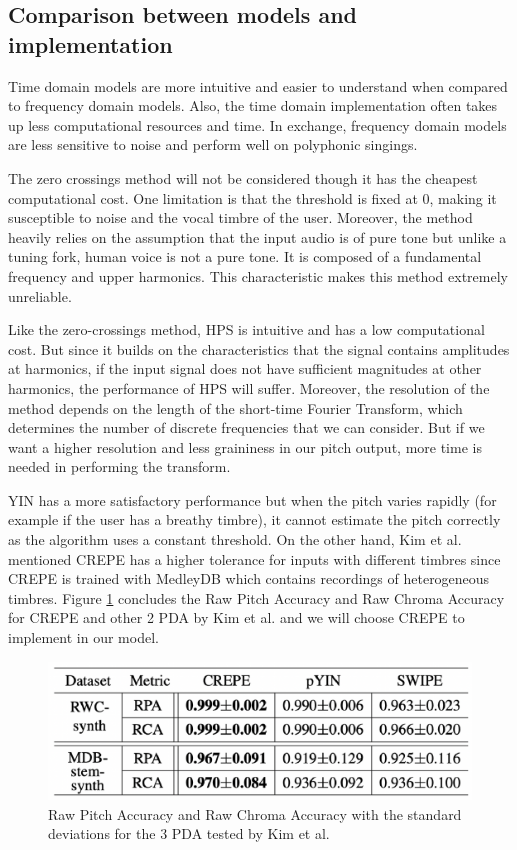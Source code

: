 \subsection{Comparison between models and implementation}
Time domain models are more intuitive and easier to understand when compared to frequency domain models.
Also, the time domain implementation often takes up less computational resources and time.
In exchange, frequency domain models are less sensitive to noise and perform well on polyphonic singings.

The zero crossings method will not be considered though it has the cheapest computational cost. One limitation is that
the threshold is fixed at 0, making it susceptible to noise and the vocal timbre of the user. Moreover, the method heavily relies on
the assumption that the input audio is of pure tone but unlike a tuning fork, human voice is not a pure tone. It is 
composed of a fundamental frequency and upper harmonics.  This characteristic makes this method extremely
unreliable.

Like the zero-crossings method, HPS is intuitive and has a low computational cost. But since it builds on the characteristics 
that the signal contains amplitudes at harmonics, if the input signal does not have sufficient magnitudes at other harmonics, the 
performance of HPS will suffer. Moreover, the resolution of the method depends on the length of the short-time Fourier Transform, which
determines the number of discrete frequencies that we can consider. But if we want a higher resolution and less graininess in our 
pitch output, more time is needed in performing the transform.

YIN has a more satisfactory performance but when the pitch varies rapidly (for example if the user has a breathy timbre), it cannot 
estimate the pitch correctly as the algorithm uses a constant threshold. On the other hand, Kim et al. mentioned CREPE has a higher 
tolerance for inputs with different timbres since CREPE is trained with MedleyDB which contains recordings of heterogeneous timbres. Figure 
\ref{CREPEperf} concludes the Raw Pitch Accuracy and Raw Chroma Accuracy for CREPE and other 2 PDA by Kim et al. and we will choose CREPE 
to implement in our model.

\begin{figure}[h]
	\centering
	\includegraphics[width=0.8\columnwidth]{Figures/CREPEperf.png}
	\caption{Raw Pitch Accuracy and Raw Chroma Accuracy with the standard deviations for the 3 PDA tested by Kim et al. }
	\label{CREPEperf}
\end{figure}

